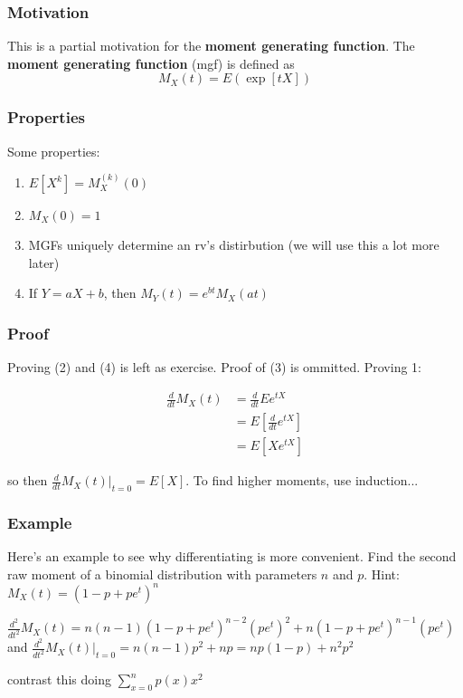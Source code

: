 \documentclass{beamer}
\begin{document}


\begin{frame}
\frametitle{Motivation}

This is a partial motivation for the \textbf{moment generating function}. The \textbf{moment generating function} (mgf) is defined as 
\[
M_X(t) =  E(\exp[tX])
\]



\end{frame}



\begin{frame}
\frametitle{Properties}

Some properties:

\begin{enumerate}
\item $E[X^k] = M_X^{(k)}(0)$
\item $M_X(0) = 1$
\item MGFs uniquely determine an rv's distirbution (we will use this a lot more later)
\item If $Y=aX+b$, then $M_Y(t) = e^{bt}M_X(at)$
\end{enumerate}

\end{frame}



\begin{frame}
\frametitle{Proof}

Proving (2) and (4) is left as exercise. Proof of (3) is ommitted. Proving 1:

\begin{align*}
\frac{d}{dt}M_X(t) &= \frac{d}{dt} Ee^{t X} \\
&= E \left[ \frac{d}{dt}e^{t X} \right] \\
&= E \left[ X e^{tX} \right]
\end{align*}

so then $\frac{d}{dt}M_X(t)|_{t=0} = E[X]$. To find higher moments, use induction...
\end{frame}



\begin{frame}
\frametitle{Example}

Here's an example to see why differentiating is more convenient. Find the second raw moment of a binomial distribution with parameters $n$ and $p$. Hint: $M_X(t) = (1 - p + pe^t)^n$
\pause
\newline

$\frac{d^2}{dt^2}M_X(t) = n(n-1)(1-p+pe^t)^{n-2}(pe^t)^2 + n(1-p+pe^t)^{n-1}(pe^t)$
and 
$\frac{d^2}{dt^2}M_X(t)|_{t=0} = n(n-1)p^2 + np = np(1-p) + n^2p^2$
\newline

contrast this doing 
$\sum_{x = 0}^n p(x)x^2$


\end{frame}
\end{document}
